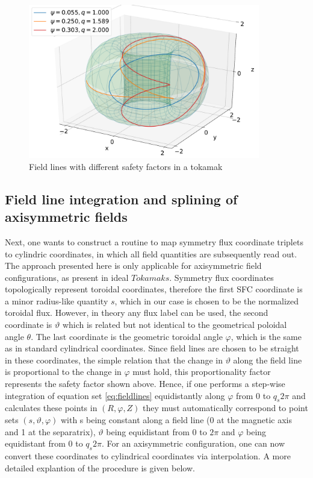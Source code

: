 \documentclass[./main.tex]{subfiles}
\begin{document}
\begin{figure}[h]
	\includegraphics[width=0.9\textwidth]{figures/field_lines_torus.pdf}
	\caption{Field lines with different safety factors in a tokamak}
	\label{fig:field_lines_torus}
\end{figure}



\subsection{Field line integration and splining of axisymmetric fields}
Next, one wants to construct a routine to map symmetry flux coordinate triplets to cylindric coordinates, in which all field quantities are subsequently read out.
The approach presented here is only applicable for axisymmetric field configurations, as present in ideal $Tokamaks$.
 Symmetry flux coordinates topologically represent toroidal coordinates, therefore the first SFC coordinate is a minor radius-like quantity $s$, which in our case is chosen to be the normalized toroidal flux. However, in theory any flux label can be used, the second coordinate is $\vartheta$ which is related but not identical to the geometrical poloidal angle $\theta$. The last coordinate is the geometric toroidal angle $\varphi$, which is the same as in standard cylindrical coordinates. Since field lines are chosen to be straight in these coordinates, the simple relation that the change in $\vartheta$ along the field line is proportional to the change in $\varphi$ must hold, this proportionality factor represents the safety factor shown above. Hence, if one performs a step-wise integration of equation set \ref{eq:fieldlines} equidistantly along $\varphi$ from 0 to $q_s2\pi$ and calculates these points in $(R,\varphi,Z)$ they must automatically correspond to point sets $(s,\vartheta,\varphi)$ with s being constant along a field line (0 at the magnetic axis and 1 at the separatrix), $\vartheta$ being equidistant from 0 to $2\pi$ and $\varphi$ being equidistant from 0 to $q_s2\pi$. For an axisymmetric configuration, one can now convert these coordinates to cylindrical coordinates via interpolation. A more detailed explantion of the procedure is given below.
\end{document}
